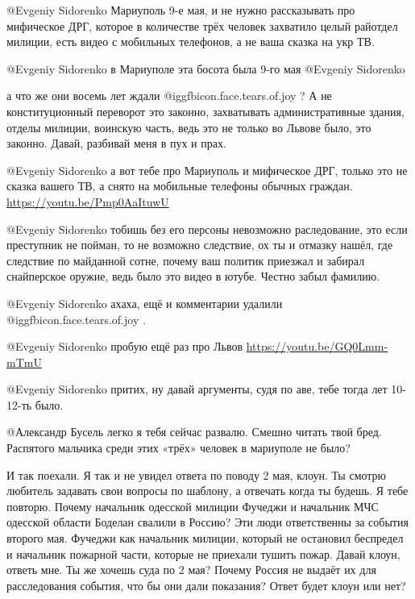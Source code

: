 \begin{multicols}{2}
\begin{itemize}

@Evgeniy Sidorenko  Мариуполь 9-е мая, и не нужно рассказывать про мифическое
ДРГ, которое в количестве трёх человек захватило целый райотдел милиции, есть
видео с мобильных телефонов, а не ваша сказка на укр ТВ. 

 @Evgeniy Sidorenko  в Мариуполе эта босота была 9-го мая
 @Evgeniy Sidorenko  

а что же они восемь лет ждали  @igg{fbicon.face.tears.of.joy} ? А не конституционный переворот это законно,
захватывать административные здания, отделы милиции, воинскую часть, ведь это
не только во Львове было, это законно. Давай, разбивай меня в пух и прах.


@Evgeniy Sidorenko  а вот тебе про Мариуполь и мифическое ДРГ, только это не
сказка вашего ТВ, а снято на мобильные телефоны обычных граждан.
\url{https://youtu.be/Pmp0AaItuwU}


@Evgeniy Sidorenko  тобишь без его персоны невозможно раследование, это если
преступник не пойман, то не возможно следствие, ох ты и отмазку нашёл, где
следствие по майданной сотне, почему ваш политик приезжал и забирал
снайперское оружие, ведь было это видео в ютубе. Честно забыл фамилию. 

@Evgeniy Sidorenko  ахаха, ещё и комментарии удалили  @igg{fbicon.face.tears.of.joy} .

@Evgeniy Sidorenko  пробую ещё раз про Львов \url{https://youtu.be/GQ0Lmm-mTmU}

@Evgeniy Sidorenko  притих, ну давай аргументы, судя по аве, тебе тогда лет 10-12-ть было. 


@Александр Бусель  легко я тебя сейчас развалю. Смешно читать твой бред.
Распятого мальчика среди этих «трёх» человек в мариуполе не было? 

И так поехали. Я так и не увидел ответа по поводу 2 мая, клоун. Ты смотрю
любитель задавать свои вопросы по шаблону, а отвечать когда ты будешь. Я тебе
повторю. Почему начальник одесской милиции Фучеджи и начальник МЧС одесской
области Боделан свалили в Россию? Эти люди ответственны за события второго мая.
Фучеджи как начальник милиции, который не остановил беспредел и начальник
пожарной части, которые не приехали тушить пожар. Давай клоун, ответь мне. Ты
же хочешь суда по 2 мая? Почему Россия не выдаёт их для расследования события,
что бы они дали показания? Ответ будет клоун или нет?


\end{itemize}
\end{multicols}
